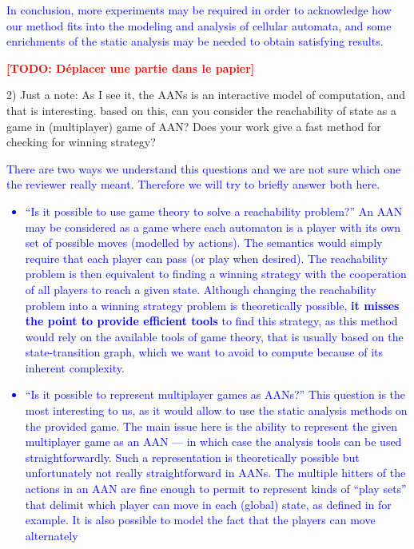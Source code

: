 \documentclass[11pt]{article}
\newcommand{\todo}[1]{\textcolor{red}{\textbf{[TODO: #1]}}}
\newcommand{\ilanswer}[1]{\textcolor{blue}{#1}}
\newcommand{\answer}[1]{\ilanswer{#1}\vspace*{1em}}
\begin{document}
\answer{In conclusion,
more experiments may be required in order to acknowledge how our method fits into the modeling and analysis of cellular automata,
and some enrichments of the static analysis may be needed to obtain satisfying results.
}

\todo{Déplacer une partie dans le papier}



2) Just a note: As I see it, the AANs is an interactive model of computation, and that is interesting. based on this, can you consider the reachability of state as a game in (multiplayer) game of AAN? Does  your work give a fast method for checking for winning strategy?   

\ilanswer{There are two ways we understand this questions and we are not sure which one the reviewer really meant. Therefore we will try to briefly answer both here.
\begin{itemize}
  \item “Is it possible to use game theory to solve a reachability problem?”
    An AAN may be considered as a game where each automaton is a player with its own set of possible moves (modelled by actions).
    The semantics would simply require that each player can pass (or play when desired).
    The reachability problem is then equivalent to finding a winning strategy with the cooperation of all players to reach a given state.
    Although changing the reachability problem into a winning strategy problem is theoretically possible,
    \textbf{it misses the point to provide efficient tools} to find this strategy,
    as this method would rely on the available tools of game theory,
    that is usually based on the state-transition graph, which we want to avoid to compute because of its inherent complexity.
  \item “Is it possible to represent multiplayer games as AANs?”
    This question is the most interesting to us, as it would allow to use the static analysis methods on the provided game.
    The main issue here is the ability to represent the given multiplayer game as an AAN ---
    in which case the analysis tools can be used straightforwardly.
    Such a representation is theoretically possible but unfortunately not really straightforward in AANs.
    The multiple hitters of the actions in an AAN are fine enough to permit to represent
    kinds of “play sets” that delimit which player can move in each (global) state,
    as defined in \cite{gradel_infinite_2002} for example.
    It is also possible to model the fact that the players can move alternately

\end{itemize}}
\end{document}
